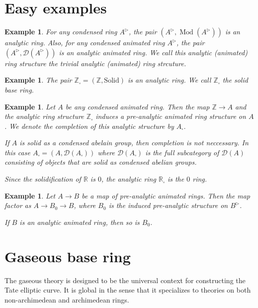 \documentclass{article}
\theoremstyle{plain}
\newtheorem{exmp}[thm]{Example}
\theoremstyle{definition}
\theoremstyle{remark}
\DeclareMathOperator{\modcat}{Mod}
\newcommand{\huflag}{\triangleright}
\newcommand{\D}{\mathcal{D}}
\newcommand{\solid}{\square}
\begin{document}
\section{Easy examples}

\begin{exmp}
For any condensed ring $ A ^{\huflag} $, the pair $ (A ^{\huflag}, \modcat (A ^{\huflag})) $ is an analytic ring.
Also, for any condensed animated ring $ A ^{\huflag} $, the pair $ (A ^{\huflag}, \D (A ^{\huflag})) $ is an analytic animated ring.
We call this analytic (animated) ring structure the \emph{trivial} analytic (animated) ring strcuture.
\end{exmp}

\begin{exmp}
The pair $ \mathbb{Z}_{\solid} = (\mathbb{Z}, \mathrm{Solid}) $ is an analytic ring.
We call $ \mathbb{Z}_{\solid} $ the solid base ring.
\end{exmp}

\begin{exmp}
Let $ A $ be any condensed animated ring. Then the map $ \mathbb{Z}\to A $ and the analytic ring structure
$ \mathbb{Z}_{\solid} $ induces a pre-analytic animated ring structure on $ A $.
We denote the completion of this analytic structure by $ A _{\solid} $.

If $ A $ is solid as a condensed abelain group, then completion is not neccessary.
In this case $ A _{\solid} = (A, \D (A _{\solid})) $ where $ \D (A _{\solid}) $ is the full subcategory
of $ \D (A) $ consisting of objects that are solid as condensed abelian groups.

Since the solidification of $ \mathbb{R} $ is $ 0 $, the analytic ring $ \mathbb{R}_{\solid} $ is the $ 0 $ ring.
\end{exmp}

\begin{exmp}
Let $ A\to B $ be a map of pre-analytic animated rings.
Then the map factor as $ A \to B _{0}\to B $, where $ B _{0}$ is the induced pre-analytic
structure on $ B ^{\huflag} $.

If $ B $ is an analytic animated ring, then so is $ B _{0} $.
\end{exmp}

\section{Gaseous base ring}

The gaseous theory is designed to be the universal context for constructing the Tate elliptic curve.
It is global in the sense that it specializes to theories on both non-archimedean and archimedean rings.
\end{document}
